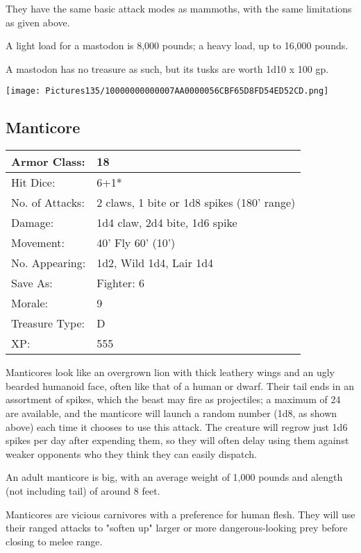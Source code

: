 \documentclass[a4paper,twoside,openany,10pt]{book}
\begin{document}
\begin{multicols}{2}
They have the same basic attack modes as mammoths, with the same limitations as given above.

A light load for a mastodon is 8,000 pounds; a heavy load, up to 16,000 pounds.

A mastodon has no treasure as such, but its tusks are worth 1d10 x 100 gp.

\begin{center} \texttt{[image: Pictures135/10000000000007AA0000056CBF65D8FD54ED52CD.png]} \end{center}


\subsection*{Manticore}\label{manticore}

\begin{tabularx}{0.50\textwidth}{@{}lX@{}}
Armor Class: & 18 \\\hline
Hit Dice: & 6+1* \\\hline
No. of Attacks: & 2 claws, 1 bite or 1d8 spikes (180' range) \\\hline
Damage: & 1d4 claw, 2d4 bite, 1d6 spike \\\hline
Movement: & 40' Fly 60' (10') \\\hline
No. Appearing: & 1d2, Wild 1d4, Lair 1d4 \\\hline
Save As: & Fighter: 6 \\\hline
Morale: & 9 \\\hline
Treasure Type: & D \\\hline
XP: & 555 \\\hline
\end{tabularx}\medskip

Manticores look like an overgrown lion with thick leathery wings and an ugly bearded humanoid face, often like that of a human or dwarf. Their tail ends in an assortment of spikes, which the beast may fire as projectiles; a maximum of 24 are available, and the manticore will launch a random number (1d8, as shown above) each time it chooses to use this attack. The creature will regrow just 1d6 spikes per day after expending them, so they will often delay using them against weaker opponents who they think they can easily dispatch.

An adult manticore is big, with an average weight of 1,000 pounds and alength (not including tail) of around 8 feet.

Manticores are vicious carnivores with a preference for human flesh. They will use their ranged attacks to "soften up" larger or more dangerous-looking prey before closing to melee range.


\end{multicols}
\end{document}
